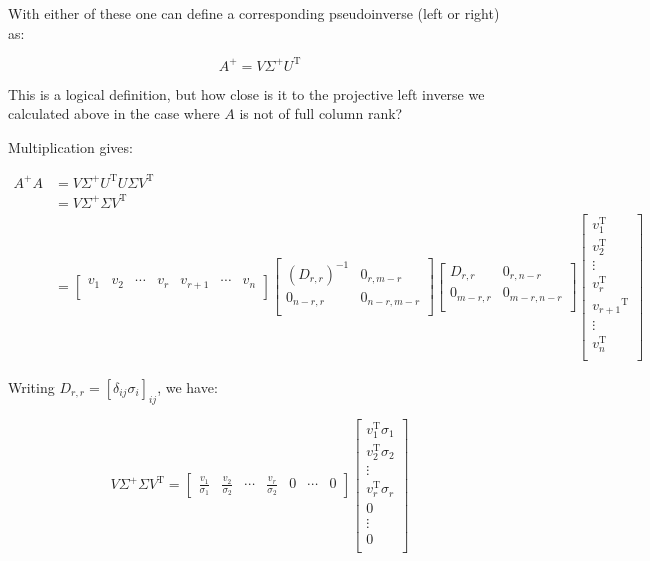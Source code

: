 \documentclass{article}      %
\newcommand{\T}[0]{\text{T}}
\begin{document}
With either of these one can define a corresponding pseudoinverse (left or right) as:

\begin{equation}
A^{+} = V \Sigma^{+} U^\T
\end{equation}

This is a logical definition, but how close is it to the projective
left inverse we calculated above in the case where $A$ is not of full column 
rank?

Multiplication gives: 

\begin{align*}
A^{+} A 
&= V \Sigma^{+} U^\T U \Sigma V^\T \\
&= V \Sigma^{+} \Sigma V^\T \\
&=
\begin{bmatrix}
v_1 & v_2 & \cdots & v_r & v_{r+1} & \cdots & v_n \\
\end{bmatrix}
\begin{bmatrix}
(D_{r,r})^{-1} & 0_{r,m-r} \\
0_{n-r,r} & 0_{n-r,m-r} \\
\end{bmatrix}
\begin{bmatrix}
D_{r,r} & 0_{r,n-r} \\
0_{m-r,r} & 0_{m-r,n-r} \\
\end{bmatrix}
\begin{bmatrix}
v_1^\T \\ v_2^\T \\ \vdots \\ v_r^\T \\ {v_{r+1}}^\T \\ \vdots \\ v_n^\T \\
\end{bmatrix}
\end{align*}

Writing $D_{r,r} = [\delta_{ij}\sigma_i]_{ij}$, we have:

\begin{equation}\label{eqn:VIrVt}
V \Sigma^{+} \Sigma V^\T 
=
\begin{bmatrix}
\frac{v_1}{\sigma_1} & \frac{v_2}{\sigma_2} & \cdots & \frac{v_r}{\sigma_2} & 0 & \cdots & 0 
\end{bmatrix}
\begin{bmatrix}
v_1^\T \sigma_1 \\ v_2^\T \sigma_2 \\ \vdots \\ v_r^\T \sigma_r \\ 0 \\ \vdots \\ 0 \\
\end{bmatrix}
\end{equation}
\end{document}
